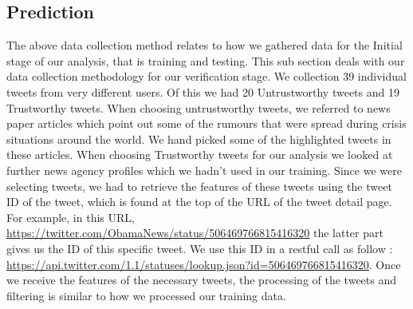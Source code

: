 \subsection{Prediction}
The above data collection method relates to how we gathered data for the Initial stage of our analysis, that is training and testing. This sub section deals with our data collection methodology for our verification stage. We collection 39 individual tweets from very different users. Of this we had 20 Untrustworthy tweets and 19 Trustworthy tweets. When choosing untrustworthy tweets, we referred to news paper articles which point out some of the rumours that were spread during crisis situations around the world. We hand picked some of the highlighted tweets in these articles. When choosing Trustworthy tweets for our analysis we looked at further news agency profiles which we hadn't used in our training. Since we were selecting tweets, we had to retrieve the features of these tweets using the tweet ID of the tweet, which is found at the top of the URL of the tweet detail page. For example, in this URL, \url{https://twitter.com/ObamaNews/status/506469766815416320} the latter part gives us the ID of this specific tweet. We use this ID in a restful call as follow : \url{https://api.twitter.com/1.1/statuses/lookup.json?id=506469766815416320}. Once we receive the features of the necessary tweets, the processing of the tweets and filtering is similar to how we processed our training data. 
\newpage
